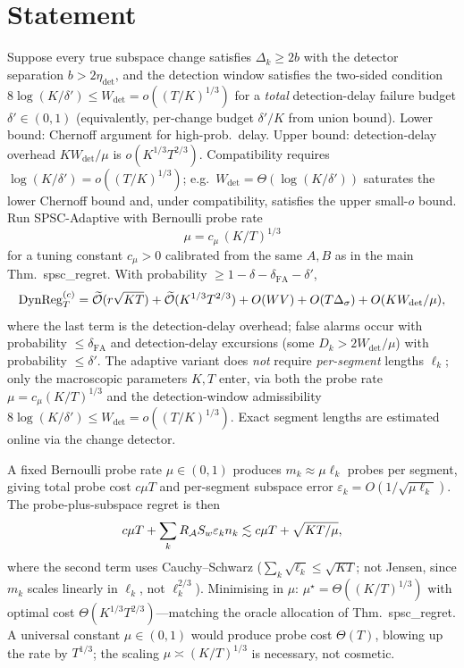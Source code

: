 \section*{Statement}

\begin{theorem}
\label{thm:spsc_adaptive}
Suppose every true subspace change satisfies $\Delta_k\ge 2b$ with the
detector separation $b>2\eta_{\mathrm{det}}$, and the detection window
satisfies the two-sided condition
$8\log(K/\delta')\le W_{\mathrm{det}} = o((T/K)^{1/3})$ for a \emph{total}
detection-delay failure budget $\delta'\in(0,1)$ (equivalently, per-change
budget $\delta'/K$ from union bound). Lower bound: Chernoff argument for
high-prob.\ delay. Upper bound: detection-delay overhead
$KW_{\mathrm{det}}/\mu$ is $o(K^{1/3}T^{2/3})$. Compatibility requires
$\log(K/\delta')=o((T/K)^{1/3})$; e.g.\ $W_{\mathrm{det}}=\Theta(\log(K/\delta'))$
saturates the lower Chernoff bound and, under compatibility, satisfies
the upper small-$o$ bound. Run SPSC-Adaptive with
Bernoulli probe rate
\[
\mu = c_\mu\,(K/T)^{1/3}
\]
for a tuning constant $c_\mu > 0$ calibrated from the same $A, B$ as
in the main Thm.\ spsc\_regret. With probability
$\ge 1-\delta-\delta_{\mathrm{FA}}-\delta'$,
\[
\mathrm{DynReg}_T^{(c)} = \widetilde{\mathcal{O}}(r\sqrt{KT}) + \widetilde{\mathcal{O}}(K^{1/3}T^{2/3})
+ O(WV) + O(T\Delta_\sigma) + O(KW_{\mathrm{det}}/\mu),
\]
where the last term is the detection-delay overhead; false alarms
occur with probability $\le\delta_{\mathrm{FA}}$ and detection-delay
excursions (some $D_k > 2W_{\mathrm{det}}/\mu$) with probability $\le\delta'$.
The adaptive variant does \emph{not} require \emph{per-segment}
lengths $\ell_k$; only the macroscopic parameters $K,T$ enter, via
both the probe rate $\mu = c_\mu(K/T)^{1/3}$ and the detection-window
admissibility $8\log(K/\delta')\le W_{\mathrm{det}}=o((T/K)^{1/3})$.
Exact segment lengths are estimated online via the change detector.
\end{theorem}

\begin{remark}[Why $\mu=\Theta((K/T)^{1/3})$ is the right scaling]
\label{rem:mu_scaling}
A fixed Bernoulli probe rate $\mu\in(0,1)$ produces $m_k\approx\mu\ell_k$
probes per segment, giving total probe cost $c\mu T$ and per-segment
subspace error $\varepsilon_k = O(1/\sqrt{\mu\ell_k})$. The
probe-plus-subspace regret is then
\[
c\mu T + \sum_k R_{\mathcal{A}} S_w\varepsilon_k n_k
\lesssim c\mu T + \sqrt{KT/\mu},
\]
where the second term uses Cauchy--Schwarz ($\sum_k\sqrt{\ell_k}\le\sqrt{KT}$;
not Jensen, since $m_k$ scales linearly in $\ell_k$, not $\ell_k^{2/3}$).
Minimising in $\mu$: $\mu^\star = \Theta((K/T)^{1/3})$ with optimal
cost $\Theta(K^{1/3}T^{2/3})$---matching the oracle allocation of
Thm.\ spsc\_regret. A universal constant $\mu\in(0,1)$ would produce
probe cost $\Theta(T)$, blowing up the rate by $T^{1/3}$; the scaling
$\mu\asymp(K/T)^{1/3}$ is necessary, not cosmetic.
\end{remark}

